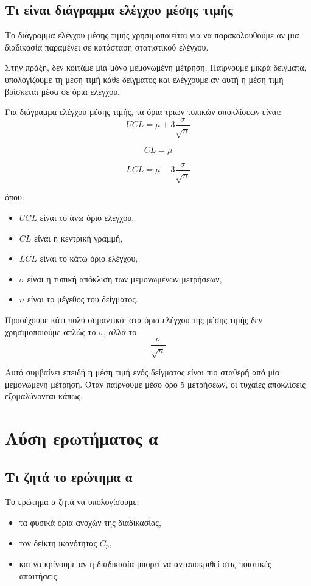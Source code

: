 \documentclass[12pt,a4paper]{article}
\begin{document}
\subsection{Τι είναι διάγραμμα ελέγχου μέσης τιμής}

Το διάγραμμα ελέγχου μέσης τιμής χρησιμοποιείται για να παρακολουθούμε αν μια διαδικασία παραμένει σε κατάσταση στατιστικού ελέγχου.

Στην πράξη, δεν κοιτάμε μία μόνο μεμονωμένη μέτρηση. Παίρνουμε μικρά δείγματα, υπολογίζουμε τη μέση τιμή κάθε δείγματος και ελέγχουμε αν αυτή η μέση τιμή βρίσκεται μέσα σε όρια ελέγχου.

Για διάγραμμα ελέγχου μέσης τιμής, τα όρια τριών τυπικών αποκλίσεων είναι:
\[
UCL=\mu+3\frac{\sigma}{\sqrt{n}}
\]

\[
CL=\mu
\]

\[
LCL=\mu-3\frac{\sigma}{\sqrt{n}}
\]

όπου:

\begin{itemize}
    \item \(UCL\) είναι το άνω όριο ελέγχου,
    \item \(CL\) είναι η κεντρική γραμμή,
    \item \(LCL\) είναι το κάτω όριο ελέγχου,
    \item \(\sigma\) είναι η τυπική απόκλιση των μεμονωμένων μετρήσεων,
    \item \(n\) είναι το μέγεθος του δείγματος.
\end{itemize}

Προσέχουμε κάτι πολύ σημαντικό: στα όρια ελέγχου της μέσης τιμής δεν χρησιμοποιούμε απλώς το \(\sigma\), αλλά το:
\[
\frac{\sigma}{\sqrt{n}}
\]

Αυτό συμβαίνει επειδή η μέση τιμή ενός δείγματος είναι πιο σταθερή από μία μεμονωμένη μέτρηση. Όταν παίρνουμε μέσο όρο 5 μετρήσεων, οι τυχαίες αποκλίσεις εξομαλύνονται κάπως.

\section{Λύση ερωτήματος α}

\subsection{Τι ζητά το ερώτημα α}

Το ερώτημα α ζητά να υπολογίσουμε:

\begin{itemize}
    \item τα φυσικά όρια ανοχών της διαδικασίας,
    \item τον δείκτη ικανότητας \(C_p\),
    \item και να κρίνουμε αν η διαδικασία μπορεί να ανταποκριθεί στις ποιοτικές απαιτήσεις.
\end{itemize}
\end{document}
